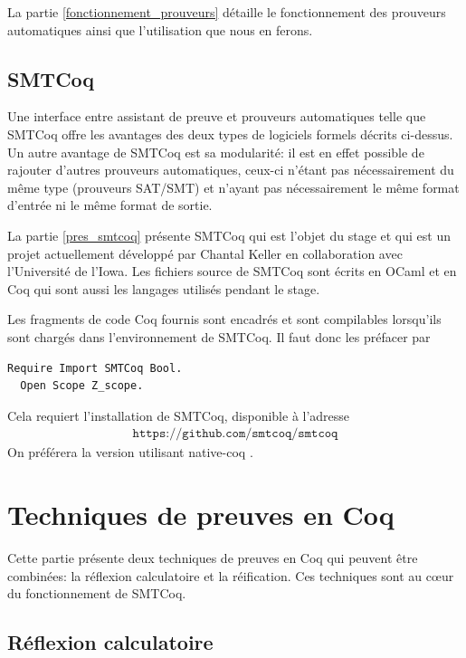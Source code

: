 \documentclass[11pt]{article}
\begin{document}
La partie \ref{fonctionnement_prouveurs} détaille le fonctionnement des prouveurs automatiques ainsi que l'utilisation que nous en ferons.


\subsection{SMTCoq}

Une interface entre assistant de preuve et prouveurs automatiques telle que SMTCoq offre les avantages des deux types de logiciels formels décrits ci-dessus. Un autre avantage de SMTCoq est sa modularité: il est en effet possible de rajouter d'autres prouveurs automatiques, ceux-ci n'étant pas nécessairement du même type (prouveurs SAT/SMT) et n'ayant pas nécessairement le même format d'entrée ni le même format de sortie. \medbreak


La partie \ref{pres_smtcoq} présente SMTCoq qui est l'objet du stage et qui est un projet actuellement développé par Chantal Keller en collaboration avec l'Université de l'Iowa. Les fichiers source de SMTCoq sont écrits en OCaml et en Coq qui sont aussi les langages utilisés pendant le stage. \medbreak

Les fragments de code Coq fournis sont encadrés et sont compilables lorsqu'ils sont chargés dans l'environnement de SMTCoq. Il faut donc les préfacer par
\begin{lstlisting}[frame=single]
  Require Import SMTCoq Bool.
  Open Scope Z_scope.
\end{lstlisting}
Cela requiert l'installation de SMTCoq, disponible à l'adresse
\begin{align*}
    \texttt{https://github.com/smtcoq/smtcoq}
\end{align*}
On préférera la version utilisant native-coq \cite{native-coq}.


\newpage

\section{Techniques de preuves en Coq} \label{coq}

Cette partie présente deux techniques de preuves en Coq qui peuvent être combinées: la réflexion calculatoire et la réification. Ces techniques sont au cœur du fonctionnement de SMTCoq.


\subsection{Réflexion calculatoire}
\end{document}
